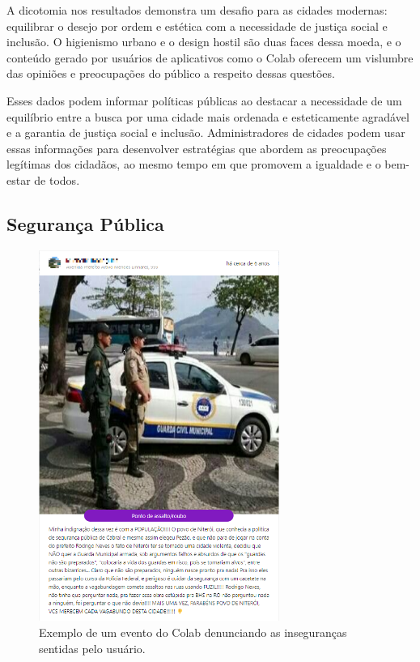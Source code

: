 A dicotomia nos resultados demonstra um desafio para as cidades modernas: equilibrar o desejo por ordem e estética com a necessidade de justiça social e inclusão. O higienismo urbano e o design hostil são duas faces dessa moeda, e o conteúdo gerado por usuários de aplicativos como o Colab oferecem um vislumbre das opiniões e preocupações do público a respeito dessas questões.

Esses dados podem informar políticas públicas ao destacar a necessidade de um equilíbrio entre a busca por uma cidade mais ordenada e esteticamente agradável e a garantia de justiça social e inclusão. Administradores de cidades podem usar essas informações para desenvolver estratégias que abordem as preocupações legítimas dos cidadãos, ao mesmo tempo em que promovem a igualdade e o bem-estar de todos.

\subsection{Segurança Pública}

\begin{figure}[htb]
	\centering
	\includegraphics[width=0.7\textwidth]{images/colab_posts_security.png}
	\caption{Exemplo de um evento do Colab denunciando as inseguranças sentidas pelo usuário.}
	\label{fig:colab_posts_security}
\end{figure}

